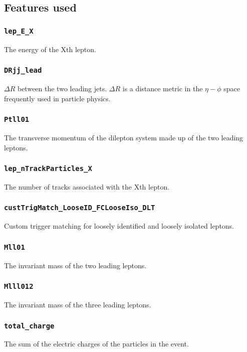 \clearpage
\subsection{Features used}

\subsubsection{\texttt{lep\_E\_X}} The energy of the Xth lepton.

\subsubsection{\texttt{DRjj\_lead}} $\Delta R$ between the two leading jets. $\Delta R$ is a distance metric in the
$\eta-\phi$ space frequently used in particle physics.

\subsubsection{\texttt{Ptll01}} The transverse momentum of the dilepton system made up of the two leading leptons.

\subsubsection{\texttt{lep\_nTrackParticles\_X}} The number of tracks associated with the Xth lepton.

\subsubsection{\texttt{custTrigMatch\_LooseID\_FCLooseIso\_DLT}} Custom trigger matching for loosely identified and loosely
isolated leptons.

\subsubsection{\texttt{Mll01}} The invariant mass of the two leading leptons.

\subsubsection{\texttt{Mlll012}} The invariant mass of the three leading leptons.

\subsubsection{\texttt{total\_charge}} The sum of the electric charges of the particles in the event.

